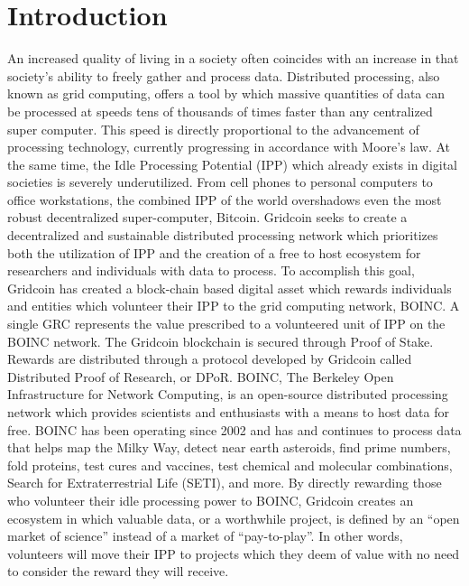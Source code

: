 \section{Introduction}
\label{sec:intro}

An increased quality of living in a society often coincides with an increase in that society’s ability to freely gather and process data.  Distributed processing, also known as grid computing, offers a tool by which massive quantities of data can be processed at speeds tens of thousands of times faster than any centralized super computer.  This speed is directly proportional to the advancement of processing technology, currently progressing in accordance with Moore’s law.  
At the same time, the Idle Processing Potential (IPP) which already exists in digital societies is severely underutilized.  From cell phones to personal computers to office workstations, the combined IPP of the world overshadows even the most robust decentralized super-computer, Bitcoin.
Gridcoin seeks to create a decentralized and sustainable distributed processing network which prioritizes both the utilization of IPP and the creation of a free to host ecosystem for researchers and individuals with data to process.
To accomplish this goal, Gridcoin has created a block-chain based digital asset which rewards individuals and entities which volunteer their IPP to the grid computing network, BOINC.  A single GRC represents the value prescribed to a volunteered unit of IPP on the BOINC network.  The Gridcoin blockchain is secured through Proof of Stake.  Rewards are distributed through a protocol developed by Gridcoin called Distributed Proof of Research, or DPoR.
BOINC, The Berkeley Open Infrastructure for Network Computing, is an open-source distributed processing network which provides scientists and enthusiasts with a means to host data for free. BOINC has been operating since 2002 and has and continues to process data that helps map the Milky Way, detect near earth asteroids, find prime numbers, fold proteins, test cures and vaccines, test chemical and molecular combinations, Search for Extraterrestrial Life (SETI), and more.
By directly rewarding those who volunteer their idle processing power to BOINC, Gridcoin creates an ecosystem in which valuable data, or a worthwhile project, is defined by an “open market of science” instead of a market of “pay-to-play”.  In other words, volunteers will move their IPP to projects which they deem of value with no need to consider the reward they will receive.  

\\

